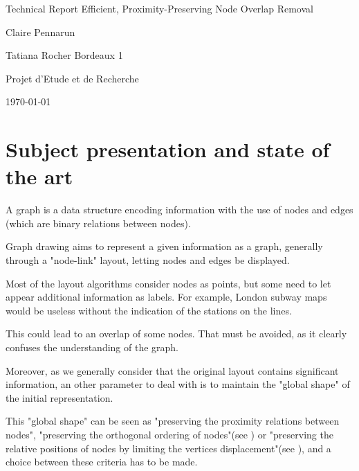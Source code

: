 \documentclass[12pt]{report}
\begin{document}
\begin{titlepage}
\begin{center}

\hfill

\bigskip
\huge{Technical Report} 
\vfill
\bigskip 
\Huge 
\bigskip Efficient, Proximity-Preserving Node Overlap Removal \par 
\vfill
\Large Claire Pennarun \par 
		Tatiana Rocher
\vfill
\Large Bordeaux 1 \par \Large Projet d'Etude et de Recherche		
		\bigskip 
\bigskip

\Large
\today
\end{center}
\end{titlepage}

\tableofcontents
\newpage


\chapter{Subject presentation and state of the art}

A graph is a data structure encoding information with the use of nodes and edges (which are binary relations between nodes).

Graph drawing aims to represent a given information as a graph, generally through a "node-link" layout, letting nodes and edges be displayed. 

\bigskip
Most of the layout algorithms consider nodes as points, but some need to let appear additional information as labels. For example, London subway maps would be useless without the indication of the stations on the lines.

This could lead to an overlap of some nodes. That must be avoided, as it clearly confuses the understanding of the graph.

Moreover, as we generally consider that the original layout contains significant information, an other parameter to deal with is to maintain the "global shape" of the initial representation. 

This "global shape" can be seen as "preserving the proximity relations between nodes", "preserving the orthogonal ordering of nodes"(see \cite{Mis95}) or "preserving the relative positions of nodes by limiting the vertices displacement"(see \cite{Gansner98}), and a choice between these criteria has to be made.
\end{document}
